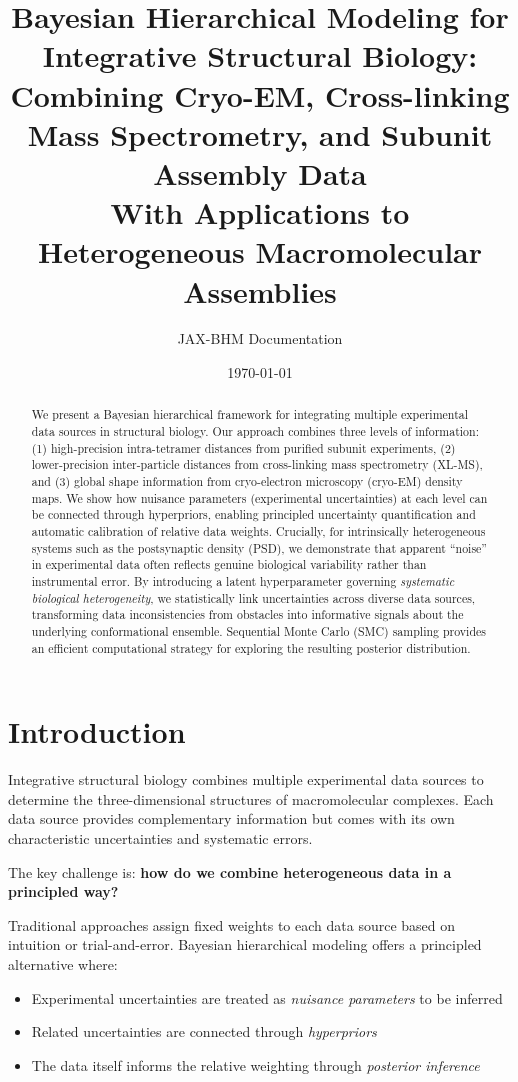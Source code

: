 \documentclass[11pt,a4paper]{article}
\title{Bayesian Hierarchical Modeling for Integrative Structural Biology:\\
\large Combining Cryo-EM, Cross-linking Mass Spectrometry, and Subunit Assembly Data\\[0.5em]
\normalsize With Applications to Heterogeneous Macromolecular Assemblies}
\author{JAX-BHM Documentation}
\date{\today}
\theoremstyle{definition}
\begin{document}
\maketitle

\begin{abstract}
We present a Bayesian hierarchical framework for integrating multiple experimental data sources in structural biology. Our approach combines three levels of information: (1) high-precision intra-tetramer distances from purified subunit experiments, (2) lower-precision inter-particle distances from cross-linking mass spectrometry (XL-MS), and (3) global shape information from cryo-electron microscopy (cryo-EM) density maps. We show how nuisance parameters (experimental uncertainties) at each level can be connected through hyperpriors, enabling principled uncertainty quantification and automatic calibration of relative data weights. Crucially, for intrinsically heterogeneous systems such as the postsynaptic density (PSD), we demonstrate that apparent ``noise'' in experimental data often reflects genuine biological variability rather than instrumental error. By introducing a latent hyperparameter governing \textit{systematic biological heterogeneity}, we statistically link uncertainties across diverse data sources, transforming data inconsistencies from obstacles into informative signals about the underlying conformational ensemble. Sequential Monte Carlo (SMC) sampling provides an efficient computational strategy for exploring the resulting posterior distribution.
\end{abstract}

\tableofcontents
\newpage

\section{Introduction}

Integrative structural biology combines multiple experimental data sources to determine the three-dimensional structures of macromolecular complexes. Each data source provides complementary information but comes with its own characteristic uncertainties and systematic errors.

The key challenge is: \textbf{how do we combine heterogeneous data in a principled way?}

Traditional approaches assign fixed weights to each data source based on intuition or trial-and-error. Bayesian hierarchical modeling offers a principled alternative where:
\begin{itemize}
    \item Experimental uncertainties are treated as \textit{nuisance parameters} to be inferred
    \item Related uncertainties are connected through \textit{hyperpriors}
    \item The data itself informs the relative weighting through \textit{posterior inference}
\end{itemize}
\end{document}
